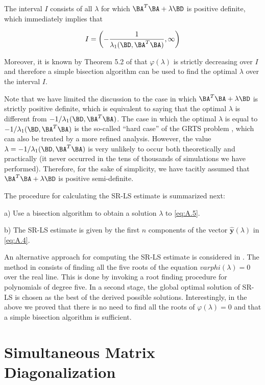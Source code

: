The interval $I$ consists of all $\lambda$ for which 
$\BA^{T}\BA + \lambda\BD$ is positive definite, which immediately implies
that 

\begin{equation} \label{eq:A.7}
I = \left(-\dfrac{1}{\lambda_1(\BD,\BA^{T}\BA)}, \infty\right)
\end{equation}

Moreover, it is known by Theorem 5.2 of \cite{More} that
$\varphi(\lambda)$ is strictly decreasing over $I$ and therefore
a simple bisection algorithm can be used to find the optimal $\lambda$
over the interval $I$.

Note that we have limited the discussion to the case in which 
$\BA^{T}\BA + \lambda\BD$ is strictly positive definite, which is
equivalent to saying that the optimal $\lambda$ is different from
$-1/\lambda_1(\BD, \BA^{T}\BA)$. The case in which the optimal $\lambda$
is equal to $-1/\lambda_1(\BD, \BA^{T}\BA)$ is the so-called
``hard case'' of the GRTS problem \cite{FortinWol}, which can 
also be treated by a more refined analysis. However, the value 
$\lambda = -1/\lambda_1(\BD, \BA^{T}\BA)$ 
is very unlikely to occur both theoretically and practically
(it never occurred in the tens of thousands of simulations we 
have performed). Therefore, for the sake of simplicity, we have
tacitly assumed that $\BA^{T}\BA + \lambda\BD$
is positive semi-definite.

The procedure for calculating the SR-LS estimate is summarized next:

a) Use a bisection algorithm to obtain a solution $\lambda$ to 
\ref{eq:A.5}.

b) The SR-LS estimate is given by the first $n$ components of the 
vector $\hat{\mathbf{y}}(\lambda)$ in \ref{eq:A.4}.

An alternative approach for computing the SR-LS estimate is considered
in \cite{CheungChan}. The method in \cite{CheungChan} consists of 
finding all the five roots
of the equation $varphi(\lambda) = 0$ over the real line. This is done
by invoking a root finding procedure for polynomials of degree five.
In a second stage, the global optimal solution of SR-LS is chosen as
the best of the derived possible solutions. Interestingly, in the
above we proved that there is no need to find all the roots of
$\varphi(\lambda) = 0$ and that a simple bisection algorithm is 
sufficient.

\section{Simultaneous Matrix Diagonalization}

